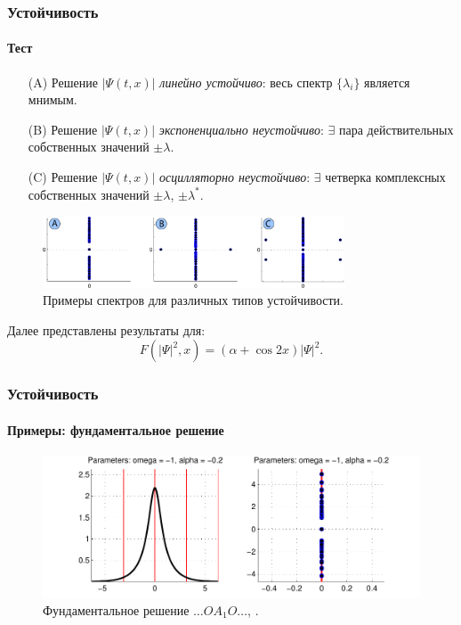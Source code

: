 \documentclass [10pt] {beamer}
\begin{document}
\begin{frame}
	\frametitle{Устойчивость}
	\framesubtitle{Тест}
	
	\begin{enumerate}
		\item[(A)] Решение $|\Psi(t, x)|$ {\it {\color{forestgreen} линейно устойчиво}}: весь спектр $\{ \lambda_i \}$ является мнимым.
		\item[(B)] Решение $|\Psi(t, x)|$ {\it {\color{fireenginered} экспоненциально неустойчиво}}: $\exists$ пара действительных собственных значений $\pm \lambda$.
		\item[(C)] Решение $|\Psi(t, x)|$ {\it {\color{fireenginered} осцилляторно неустойчиво}}: $\exists$ четверка комплексных собственных значений $\pm \lambda$, $\pm \lambda^*$.
	\end{enumerate}
	
	\begin{figure}
		\includegraphics[width=0.8\textwidth]{pic/test.pdf}
		\caption{Примеры спектров для различных типов устойчивости.}
		\label{pic:test}
	\end{figure}
	
	Далее представлены результаты для:
	$$F(|\Psi|^2, x) = (\alpha + \cos 2x) |\Psi|^2.$$
\end{frame}

\begin{frame}
	\frametitle{Устойчивость}
	\framesubtitle{Примеры: фундаментальное решение}
	
	\begin{figure}
		\includegraphics[width=1\textwidth]{pic/example_1.pdf}
		\caption{Фундаментальное решение $\dots O A_1 O \dots$, {\it \color{forestgreen}{линейно устойчиво}}.}
		\label{pic:example_1}
	\end{figure}
\end{frame}
\end{document}
